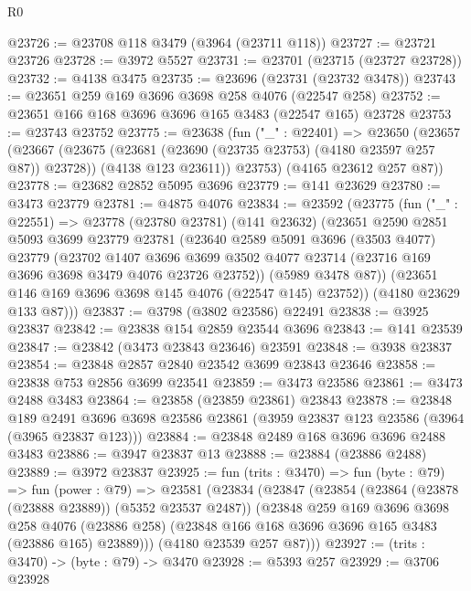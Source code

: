 \begin{lexlean}{R0}
\begin{coremodule}
@23726 := @23708 @118 @3479 (@3964 (@23711 @118))
@23727 := @23721 @23726
@23728 := @3972 @5527
@23731 := @23701 (@23715 (@23727 @23728))
@23732 := @4138 @3475
@23735 := @23696 (@23731 (@23732 @3478))
@23743 := @23651 @259 @169 @3696 @3698 @258 @4076 (@22547 @258)
@23752 := @23651 @166 @168 @3696 @3696 @165 @3483 (@22547 @165) @23728
@23753 := @23743 @23752
@23775 := @23638
    (fun ("_" : @22401) =>
    @23650
      (@23657
        (@23667
          (@23675 (@23681 (@23690 (@23735 @23753) (@4180 @23597 @257 @87)) @23728))
          (@4138 @123 @23611))
        @23753)
      (@4165 @23612 @257 @87))
@23778 := @23682 @2852 @5095 @3696
@23779 := @141 @23629
@23780 := @3473 @23779
@23781 := @4875 @4076
@23834 := @23592
    (@23775
      (fun ("_" : @22551) =>
      @23778
        (@23780 @23781)
        (@141 @23632)
        (@23651
          @2590
          @2851
          @5093
          @3699
          @23779
          @23781
          (@23640
            @2589
            @5091
            @3696
            (@3503 @4077)
            @23779
            (@23702
              @1407
              @3696
              @3699
              @3502
              @4077
              @23714
              (@23716 @169 @3696 @3698 @3479 @4076 @23726 @23752))
            (@5989 @3478 @87))
          (@23651 @146 @169 @3696 @3698 @145 @4076 (@22547 @145) @23752))
        (@4180 @23629 @133 @87)))
@23837 := @3798 (@3802 @23586) @22491
@23838 := @3925 @23837
@23842 := @23838 @154 @2859 @23544 @3696
@23843 := @141 @23539
@23847 := @23842 (@3473 @23843 @23646) @23591
@23848 := @3938 @23837
@23854 := @23848 @2857 @2840 @23542 @3699 @23843 @23646
@23858 := @23838 @753 @2856 @3699 @23541
@23859 := @3473 @23586
@23861 := @3473 @2488 @3483
@23864 := @23858 (@23859 @23861) @23843
@23878 := @23848
    @189
    @2491
    @3696
    @3698
    @23586
    @23861
    (@3959 @23837 @123 @23586 (@3964 (@3965 @23837 @123)))
@23884 := @23848 @2489 @168 @3696 @3696 @2488 @3483
@23886 := @3947 @23837 @13
@23888 := @23884 (@23886 @2488)
@23889 := @3972 @23837
@23925 := fun (trits : @3470) =>
  fun (byte : @79) =>
  fun (power : @79) =>
  @23581
    (@23834
      (@23847
        (@23854
          (@23864 (@23878 (@23888 @23889)) (@5352 @23537 @2487))
          (@23848
            @259
            @169
            @3696
            @3698
            @258
            @4076
            (@23886 @258)
            (@23848 @166 @168 @3696 @3696 @165 @3483 (@23886 @165) @23889)))
        (@4180 @23539 @257 @87)))
@23927 := (trits : @3470) -> (byte : @79) -> @3470
@23928 := @5393 @257
@23929 := @3706 @23928

\end{coremodule}
\end{lexlean}
